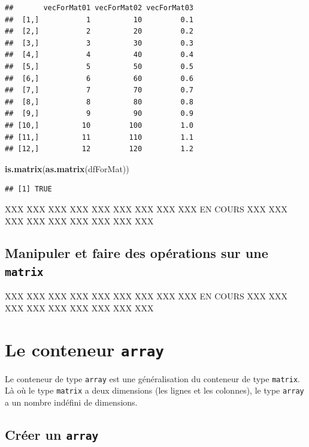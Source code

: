 \documentclass[]{book}
\newenvironment{Shaded}{\begin{snugshade}}{\end{snugshade}}
\newcommand{\KeywordTok}[1]{\textcolor[rgb]{0.13,0.29,0.53}{\textbf{#1}}}
\newcommand{\NormalTok}[1]{#1}
\begin{document}
\begin{verbatim}
##       vecForMat01 vecForMat02 vecForMat03
##  [1,]           1          10         0.1
##  [2,]           2          20         0.2
##  [3,]           3          30         0.3
##  [4,]           4          40         0.4
##  [5,]           5          50         0.5
##  [6,]           6          60         0.6
##  [7,]           7          70         0.7
##  [8,]           8          80         0.8
##  [9,]           9          90         0.9
## [10,]          10         100         1.0
## [11,]          11         110         1.1
## [12,]          12         120         1.2
\end{verbatim}

\begin{Shaded}
\begin{Highlighting}[]
\KeywordTok{is.matrix}\NormalTok{(}\KeywordTok{as.matrix}\NormalTok{(dfForMat))}
\end{Highlighting}
\end{Shaded}

\begin{verbatim}
## [1] TRUE
\end{verbatim}

XXX XXX XXX XXX XXX XXX XXX XXX XXX EN COURS XXX XXX XXX XXX XXX XXX XXX
XXX XXX

\subsection{\texorpdfstring{Manipuler et faire des opérations sur une
\texttt{matrix}}{Manipuler et faire des opérations sur une matrix}}\label{manipuler-et-faire-des-operations-sur-une-matrix}

XXX XXX XXX XXX XXX XXX XXX XXX XXX EN COURS XXX XXX XXX XXX XXX XXX XXX
XXX XXX

\section{\texorpdfstring{Le conteneur
\texttt{array}}{Le conteneur array}}\label{le-conteneur-array}

Le conteneur de type \texttt{array} est une généralisation du conteneur
de type \texttt{matrix}. Là où le type \texttt{matrix} a deux dimensions
(les lignes et les colonnes), le type \texttt{array} a un nombre
indéfini de dimensions.

\subsection{\texorpdfstring{Créer un
\texttt{array}}{Créer un array}}\label{creer-un-array}
\end{document}
